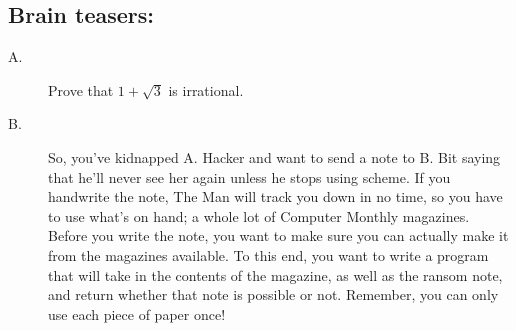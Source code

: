 \documentclass{article}
\begin{document}
\subsection*{Brain teasers:}
\begin{description}
\item[A.] Prove that $1 + \sqrt{3}$ is irrational. %

\item[B.] So, you’ve kidnapped A. Hacker and want to send a note to B. Bit saying that he’ll never see her again unless he stops using scheme. If you handwrite the note, The Man will track you down in no time, so you have to use what’s on hand; a whole lot of Computer Monthly magazines. Before you write the note, you want to make sure you can actually make it from the magazines available. To this end, you want to write a program that will take in the contents of the magazine, as well as the ransom note, and return whether that note is possible or not. Remember, you can only use each piece of paper once! %

\end{description}
\end{document}

